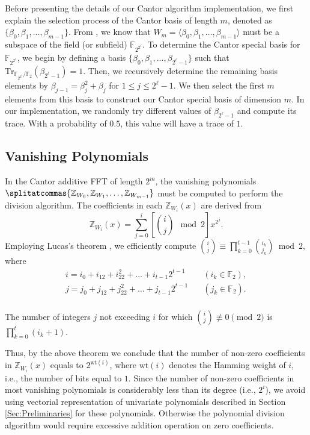 Before presenting the details of our Cantor algorithm implementation, we first explain the selection process of the Cantor basis of length $m$, denoted as $\{\beta_0, \beta_1, \ldots, \beta_{m-1}\}$. From \cite[Appendix]{Gao2010FFT}, we know that $W_m = \langle \beta_0, \beta_1, \ldots, \beta_{m-1} \rangle$ must be a subspace of the field (or subfield) $\mathbb{F}_{2^{2^\ell}}$. To determine the Cantor special basis for $\mathbb{F}_{2^{2^\ell}}$, we begin by defining a basis $\{\beta_0, \beta_1, \ldots, \beta_{2^\ell-1}\}$ such that $\text{Tr}_{\mathbb{F}_{2^{2^\ell}}/\mathbb{F}_2}(\beta_{2^\ell-1}) = 1$. Then, we recursively determine the remaining basis elements by $\beta_{j-1} = \beta_j^2 + \beta_j$ for $1 \leq j \leq 2^\ell-1$. We then select the first $m$ elements from this basis to construct our Cantor special basis of dimension $m$. In our implementation, we randomly try different values of $\beta_{2^\ell-1}$ and compute its trace. With a probability of $0.5$, this value will have a trace of $1$.


\subsection{Vanishing Polynomials}
\label{sec:Vanishing Polynomials}
In the Cantor additive FFT of length $2^m$, the vanishing polynomials $\splitatcommas{\mathbb{Z}_{W_{0}}, \mathbb{Z}_{W_{1}}, \ldots, \mathbb{Z}_{W_{m-1}}}$ must be computed to perform the division algorithm. The coefficients in each $\mathbb{Z}_{W_{i}}(x)$ are derived from
\[
\mathbb{Z}_{W_{i}}(x) = \sum_{j=0}^{i} \left[{i \choose j} \mod 2\right] x^{2^j}.
\]
Employing Lucas's theorem \cite{Lucas1878}, we efficiently compute
$
{i \choose j} \equiv \prod_{k=0}^{t-1} {i_k \choose j_k} \bmod 2,
$
where 
\[
\begin{aligned}
	i = i_0 + i_12 + i_22^2 + \ldots + i_{t-1}2^{t-1} \quad &(i_k \in \mathbb{F}_2), \\
	j = j_0 + j_12 + j_22^2 + \ldots + j_{t-1}2^{t-1} \quad &(j_k \in \mathbb{F}_2).\\
\end{aligned}
\]

\begin{theorem}\cite[Theorem 2]{Fine1947}
	The number of integers $j$ not exceeding $i$ for which $\binom{i}{j} \not\equiv 0 \pmod{2}$ is $\prod_{k=0}^{t} (i_k + 1)$.
\end{theorem}

Thus, by the above theorem we conclude that the number of non-zero coefficients in $\mathbb{Z}_{W_{i}}(x)$ equals to $2^{\text{wt}(i)}$, where $\text{wt}(i)$ denotes the Hamming weight  of $i$, i.e., the number of bits equal to $1$. Since the number of non-zero coefficients in most vanishing polynomials is considerably less than its degree (i.e., $2^{i}$), we avoid using vectorial representation of univariate polynomials described in Section \ref{Sec:Preliminaries} for these polynomials. Otherwise the polynomial division algorithm would require excessive addition operation on zero coefficients.

